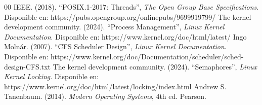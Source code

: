 \documentclass[conference]{IEEEtran}
\begin{document}
\begin{thebibliography}{00}
	 IEEE. (2018). ``POSIX.1-2017: Threads'', \textit{The Open Group Base Specifications}. Disponible en: https://pubs.opengroup.org/onlinepubs/9699919799/
	 The kernel development community. (2024). ``Process Management'', \textit{Linux Kernel Documentation}. Disponible en: https://www.kernel.org/doc/html/latest/
	 Ingo Molnár. (2007). ``CFS Scheduler Design'', \textit{Linux Kernel Documentation}. Disponible en: https://www.kernel.org/doc/Documentation/scheduler/sched-design-CFS.txt
	 The kernel development community. (2024). ``Semaphores'', \textit{Linux Kernel Locking}. Disponible en: https://www.kernel.org/doc/html/latest/locking/index.html
	 Andrew S. Tanenbaum. (2014). \textit{Modern Operating Systems}, 4th ed. Pearson.
\end{thebibliography}
\end{document}
